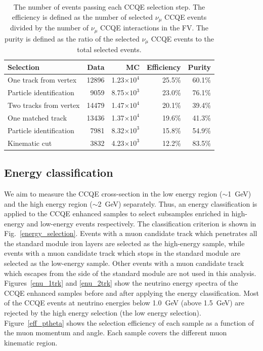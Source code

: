 \documentclass[%
 reprint,
superscriptaddress,
 amsmath,amssymb,
 aps,
]{revtex4-1}
\begin{document}
\begin{table}[htbp]
	\begin{center}
		\caption{The number of events passing each CCQE selection step. The efficiency is defined as the number of selected $\nu_\mu$ CCQE events divided by the number of $\nu_\mu$ CCQE interactions in the FV. The purity is defined as the ratio of the selected $\nu_\mu$ CCQE events to the total selected events.}
		\vspace*{-0.1cm}
		\begin{tabular}{lrrrr} \hline \hline
			Selection &Data &MC &Efficiency&Purity\\ \hline
			One track from vertex & 12896 & 1.23$\times 10^{4}$& 25.5\%&60.1\%\\
			Particle identification      & 9059 & 8.75$\times 10^{3}$& 23.0\%& 76.1\%\\
			\hline
			Two tracks from vertex &14479  & 1.47$\times 10^{4}$& 20.1\%& 39.4\%\\
			One matched track &13436  & 1.37$\times 10^{4}$& 19.6\%& 41.3\%\\
			Particle identification      &7981  & 8.32$\times 10^{3}$& 15.8\%& 54.9\%\\
			Kinematic cut                &3832  & 4.23$\times 10^{3}$& 12.2\%& 83.5\%\\
			\hline \hline
		\end{tabular}
		\label{event_selection_summary_ccqe}
	\end{center}
\end{table}

\subsection{Energy classification}
We aim to measure the CCQE cross-section in the low energy region ($\sim$1~GeV) and the high energy region ($\sim$2~GeV) separately.
Thus, an energy classification is applied to the CCQE enhanced samples to select subsamples enriched in high-energy and low-energy events
respectively.
The classification criterion is shown in Fig.~\ref{energy_selection}.
Events with a muon candidate track which penetrates all the standard module iron layers are selected as the high-energy sample, while
events with a muon candidate track which stops in the standard module are selected as the low-energy sample. Other events with a muon candidate track which escapes from the side of the standard module are not used in this analysis.
Figures~\ref{enu_1trk} and \ref{enu_2trk} show the neutrino energy spectra of the CCQE enhanced samples before and after applying the energy classification.
Most of the CCQE events at neutrino energies below 1.0~GeV (above 1.5~GeV) are rejected by the high energy selection (the low energy selection).
Figure~\ref{eff_ptheta} shows the selection efficiency of each sample as a function of the muon momentum and angle. Each sample covers the different muon kinematic region.
\end{document}
